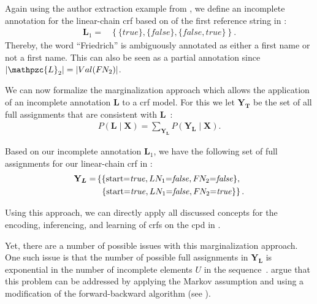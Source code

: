 Again using the author extraction example from , we define an incomplete annotation for the \gls{linear-chain crf} based on of the first reference string in :
\begin{equation*}
\begin{split}
  \bm{L}_1=&\left\{\{\mathit{true}\},\{\mathit{false}\},\{\mathit{false},\mathit{true}\}\right\}.
\end{split}
\end{equation*}
Thereby, the word ``Friedrich'' is ambiguously annotated as either a first name or not a first name.
This can also be seen as a partial annotation since $|\mathpzc{L}_2|=|Val(F\rs N_2)|$.

\bigskip

We can now formalize the marginalization approach which allows the application of an incomplete annotation $\bm{L}$ to a \gls{crf} model.
For this we let $\mathbf{Y}_{\bm{T}}$ be the set of all \glspl{full assignment} that are consistent with $\bm{L}$~\citep{tsuboi2008training}:
\begin{equation}
  \label{equ:crf-marginalization}
  \begin{split}
    P\left(\bm{L}\mid\mathbf{X}\right)=\sum_{\mathbf{Y}_{\bm{L}}}P\left(\mathbf{Y}_{\bm{L}}\mid\mathbf{X}\right).
  \end{split}
\end{equation}

Based on our incomplete annotation $\bm{L}_1$, we have the following set of \glspl{full assignment} for our \gls{linear-chain crf} in :
\begin{equation*}
\begin{split}
  \mathbf{Y}_{\bm{L}}=&\left\{\{\text{start}{=}\mathit{true},LN_1{=}\mathit{false},F\hspace{-0.07em} N_2{=}\mathit{false}\},\right.\\
  &\hspace{0.15cm}\left.\{\text{start}{=}\mathit{true},LN_1{=}\mathit{false},F\hspace{-0.07em} N_2{=}\mathit{true}\}\right\}.\\
\end{split}
\end{equation*}

Using this approach, we can directly apply all discussed concepts for the encoding, inferencing, and learning of \glspl{crf} on the \gls{cpd} in .

\bigskip

Yet, there are a number of possible issues with this marginalization approach.
One such issue is that the number of possible \glspl{full assignment} in $\mathbf{Y}_{\bm{L}}$ is exponential in the number of incomplete elements $U$ in the sequence~\citep{tsuboi2008training}.
\citep{tsuboi2008training} argue that this problem can be addressed by applying the Markov assumption and using a modification of the forward-backward algorithm (see ).


